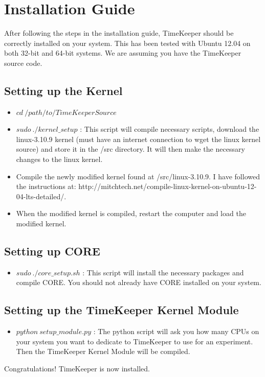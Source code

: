 \chapter{Installation Guide}
\label{chap:install}
After following the steps in the installation guide, TimeKeeper should be correctly installed on your system. This has been tested with Ubuntu 12.04 on both 32-bit and 64-bit systems. We are assuming you have the TimeKeeper source code.

\section{Setting up the Kernel}
\begin{itemize}
\item $cd\ /path/to/TimeKeeperSource$
\item $sudo\ ./kernel\_setup$ : This script will compile necessary scripts, download the linux-3.10.9 kernel (must have an internet connection to wget the linux kernel source) and store it in the /src directory. It will then make the necessary changes to the linux kernel.
\item Compile the newly modified kernel found at /src/linux-3.10.9. I have followed the instructions at: http://mitchtech.net/compile-linux-kernel-on-ubuntu-12-04-lts-detailed/.
\item When the modified kernel is compiled, restart the computer and load the modified kernel.
\end{itemize}

\section{Setting up CORE}
\begin{itemize}
\item $sudo\ ./core\_setup.sh$ : This script will install the necessary packages and compile CORE. You should not already have CORE installed on your system. 
\end{itemize}

\section{Setting up the TimeKeeper Kernel Module}
\begin{itemize}
\item $python\ setup\_module.py$ : The python script will ask you how many CPUs on your system you want to dedicate to TimeKeeper to use for an experiment. Then the TimeKeeper Kernel Module will be compiled. 
\end{itemize}
Congratulations! TimeKeeper is now installed.

